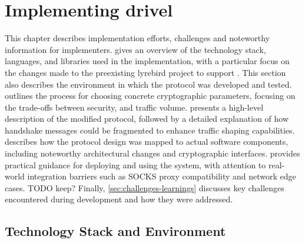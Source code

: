 \chapter{Implementing drivel}\label{ch:implementation}

This chapter describes implementation efforts, challenges and noteworthy information for implementers.
 gives an overview of the technology stack, languages, and libraries used in the implementation, with a particular focus on the changes made to the preexisting lyrebird project \cite{lyrebird} to support \drivel{}. This section also describes the environment in which the protocol was developed and tested.
 outlines the process for choosing concrete cryptographic parameters, focusing on the trade-offs between security, and traffic volume.
 presents a high-level description of the modified \drivel{} protocol, followed by a detailed explanation of how handshake messages could be fragmented to enhance traffic shaping capabilities.
 describes how the protocol design was mapped to actual software components, including noteworthy architectural changes and cryptographic interfaces.
 provides practical guidance for deploying and using the system, with attention to real-world integration barriers such as SOCKS proxy compatibility and network edge cases. TODO keep?
Finally, \cref{sec:challenges-learnings} discusses key challenges encountered during development and how they were addressed.



\section{Technology Stack and Environment} \label{sec:tech-stack}


